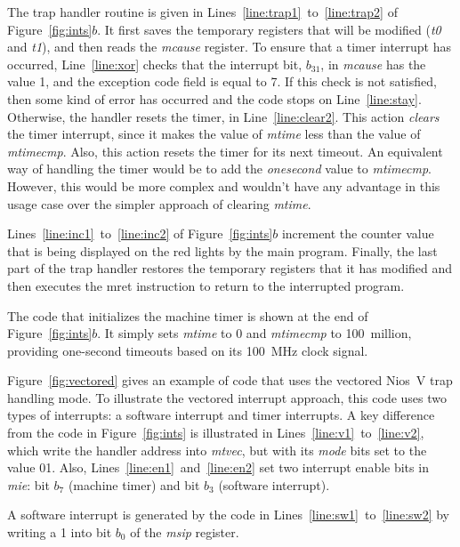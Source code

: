 \documentclass[11pt, twoside, pdftex]{article}
\begin{document}
The trap handler routine is given in Lines~\ref{line:trap1}~to~\ref{line:trap2} of
Figure~\ref{fig:ints}$b$.  It first saves the temporary registers that will be modified
({\it t0} and {\it t1}), and then reads the {\it mcause} register. To ensure that a timer
interrupt has occurred, Line~\ref{line:xor} checks that the interrupt bit, $b_{31}$, in
{\it mcause} has the value 1, and the exception code field is equal to 7. If this check is not
satisfied, then some kind of error has occurred and the code stops on
Line~\ref{line:stay}. Otherwise, the handler resets the timer, in
Line~\ref{line:clear2}. This action {\it clears} the timer 
interrupt, since it makes the value of {\it mtime} less than the value of 
{\it mtimecmp}. Also, this action resets the timer for its next timeout. An equivalent way
of handling the timer would be to add the {\it onesecond} value to {\it mtimecmp}.
However, this would be more complex and wouldn't have any advantage in this
usage case over the simpler approach of clearing {\it mtime}. 

Lines~\ref{line:inc1}~to~\ref{line:inc2} of Figure~\ref{fig:ints}$b$ increment the counter
value that is being displayed on the red lights by the main program. Finally, the last
part of the trap handler restores the temporary registers that it has modified and then 
executes the {\sf mret} instruction to return to the interrupted program.

The code that initializes the machine timer is shown at the end of
Figure~\ref{fig:ints}$b$. It simply sets {\it mtime} to 0 and {\it mtimecmp} to 100~million,
providing one-second timeouts based on its 100~MHz clock signal. 

Figure~\ref{fig:vectored} gives an example of code that uses the vectored Nios~V trap 
handling mode. To illustrate the vectored interrupt approach, this code uses two 
types of interrupts: a software interrupt and timer interrupts. A key difference from the
code in Figure~\ref{fig:ints} is illustrated in Lines~\ref{line:v1}~to~\ref{line:v2}, 
which write the handler address into {\it mtvec}, but with its {\it mode} bits set to the
value 01. Also, Lines~\ref{line:en1}~and~\ref{line:en2} set two interrupt enable bits in
{\it mie}: bit $b_7$ (machine timer) and bit $b_3$ (software interrupt). 

A software interrupt is generated by the code in Lines~\ref{line:sw1}~to~\ref{line:sw2}
by writing a 1 into bit $b_0$ of the {\it msip} register.
\end{document}
